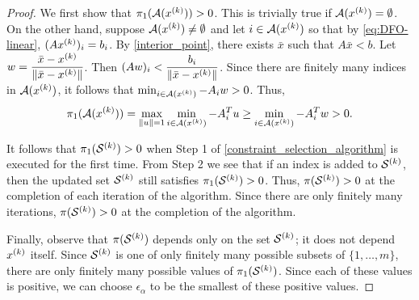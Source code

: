 \documentclass{article}
\begin{document}

\begin{proof}


We first show that ${\pi_1}({\mathcal A}(x^{(k)})) > 0$.   This is trivially true if ${\mathcal A}(x^{(k)})=\emptyset$.   On the other hand, suppose ${\mathcal A}(x^{(k)}) \ne \emptyset$ and let  $i \in {\mathcal A}(x^{(k)})$ so that by \cref{eq:DFO-linear},  $(Ax^{(k)})_i = b_i$.  By \cref{interior_point}, there exists $\bar{x}$ such that $A\bar{x} < b$.  Let $\displaystyle w=\frac{\bar{x}-x^{(k)}}{\|\bar{x}-x^{(k)}\|}$.   Then $\displaystyle (Aw)_i < \frac{b_i}{\|\bar{x}-x^{(k)}\|}$.   Since there are finitely many indices in ${\mathcal A}(x^{(k)})$, it follows that $\min_{i \in {\mathcal A}(x^{(k)})} -A_i w > 0$.
Thus, 
\begin{align*}
{\pi_1}({\mathcal A}(x^{(k)})) =  \max_{\|u\| = 1} \min_{i \in {\mathcal A}(x^{(k)})} -{{A}}_i^Tu
\ge \min_{i \in {\mathcal A}(x^{(k)})} - {{A}}_i^Tw > 0.
\end{align*}

It follows that ${\pi_1}(\mathcal{S}^{(k)}) > 0$ when Step 1 of \cref{constraint_selection_algorithm} is executed for the first time.  From Step 2 we see that if an index is added to $\mathcal{S}^{(k)}$, then the updated set $\mathcal{S}^{(k)}$ still satisfies ${\pi_1}(\mathcal{S}^{(k)}) > 0$.     Thus,  $\pi(\mathcal{S}^{(k)}) > 0$ at the completion of each iteration of the algorithm.  Since there are only finitely many iterations, $\pi(\mathcal{S}^{(k)}) > 0$ at the completion of the algorithm.

Finally, observe that $\pi(\mathcal{S}^{(k)})$ depends only on the set $\mathcal{S}^{(k)}$; it does not depend $x^{(k)}$ itself.    Since $\mathcal{S}^{(k)}$ is one of only finitely many possible subsets of $\{ 1, \ldots, m\}$,  there are only finitely many possible values of ${\pi_1}(\mathcal{S}^{(k)})$.   Since each of these values is positive,
we can choose $\epsilon_{\alpha}$ to be the smallest of these positive values.
\end{proof}











%
\end{document}

